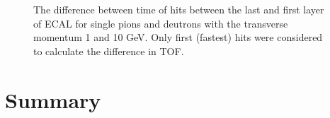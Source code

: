 \documentclass[final,1p,11pt]{elsarticle}
\begin{document}
\begin{figure}
\begin{center}
\end{center}
\caption{The difference between time of hits between the last and first layer of ECAL for single pions and deutrons with the transverse momentum 1 and 10 GeV. 
Only first (fastest) hits were considered to calculate the difference in TOF. }
\label{fig:timediff}
\end{figure}



\clearpage 





%

%


\section{Summary}
\end{document}
